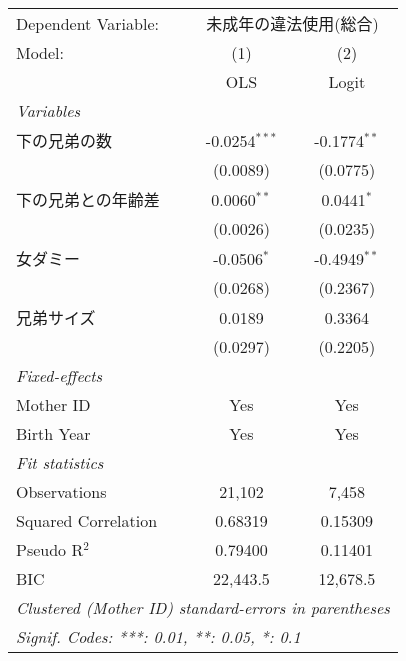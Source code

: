 \documentclass{article}
\begin{document}
\begingroup
\centering
\begin{tabular}{lcc}
   \tabularnewline \midrule \midrule
   Dependent Variable: & \multicolumn{2}{c}{未成年の違法使用(総合)}\\
   Model:              & (1)             & (2)\\  
                       &  OLS            & Logit\\  
   \midrule
   \emph{Variables}\\
   下の兄弟の数        & -0.0254$^{***}$ & -0.1774$^{**}$\\   
                       & (0.0089)        & (0.0775)\\   
   下の兄弟との年齢差  & 0.0060$^{**}$   & 0.0441$^{*}$\\   
                       & (0.0026)        & (0.0235)\\   
   女ダミー            & -0.0506$^{*}$   & -0.4949$^{**}$\\   
                       & (0.0268)        & (0.2367)\\   
   兄弟サイズ          & 0.0189          & 0.3364\\   
                       & (0.0297)        & (0.2205)\\   
   \midrule
   \emph{Fixed-effects}\\
   Mother ID           & Yes             & Yes\\  
   Birth Year          & Yes             & Yes\\  
   \midrule
   \emph{Fit statistics}\\
   Observations        & 21,102          & 7,458\\  
   Squared Correlation & 0.68319         & 0.15309\\  
   Pseudo R$^2$        & 0.79400         & 0.11401\\  
   BIC                 & 22,443.5        & 12,678.5\\  
   \midrule \midrule
   \multicolumn{3}{l}{\emph{Clustered (Mother ID) standard-errors in parentheses}}\\
   \multicolumn{3}{l}{\emph{Signif. Codes: ***: 0.01, **: 0.05, *: 0.1}}\\
\end{tabular}
\par\endgroup
\end{document}
